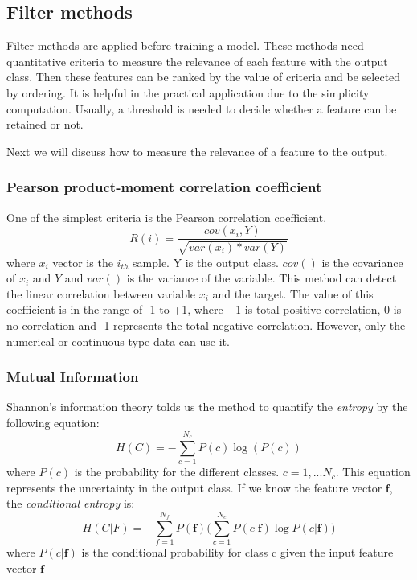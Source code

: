 \subsection{Filter methods}
Filter methods are applied before training a model. These methods need quantitative criteria to measure the relevance of each feature with the output class. Then these features can be ranked by the value of criteria and be selected by ordering. It is helpful in the practical application due to the simplicity computation. Usually, a threshold is needed to decide whether a feature can be retained or not. 

Next we will discuss how to measure the relevance of a feature to the output.

\subsubsection{Pearson product-moment correlation coefficient}

One of the simplest criteria is the Pearson correlation coefficient\cite{benesty2009pearson}.
\begin{equation} \label{Eq:pearsoncoefficient}
R(i)=\frac{cov(x_i,Y)}{\sqrt{var(x_i)*var(Y)}}
\end{equation}
where $x_i$ vector is the $i_{th}$ sample. Y is the output class. $cov()$ is the covariance of $x_i$ and $Y$ and $var()$ is the variance of the variable. This method can detect the linear correlation between variable $x_i$ and the target. The value of this coefficient is in the range of -1 to +1, where +1 is total positive correlation, 0 is no correlation and -1 represents the total negative correlation. However, only the numerical or continuous type data can use it.
\subsubsection{Mutual Information}
Shannon's information theory\cite{shannon2001mathematical} tolds us the method to quantify the \textit{entropy} by the following equation:
\begin{equation} \label{Eq:entropy}
H(C)=-\sum_{c=1}^{N_c}{P(c)\log(P(c))}
\end{equation}
where $P(c)$ is the probability for the different classes. $c=1,...N_c$. This equation represents the uncertainty in the output class. If we know the feature vector $\bm{f}$, the \textit{conditional entropy} is:
\begin{equation} \label{Eq:conditionalEntropy}
H(C|F)=-\sum_{f=1}^{N_f}{P(\bm{f})(\sum_{c=1}^{N_c}{P(c|\bm{f})\log{P(c|\bm{f})})}}
\end{equation}
where $P(c|\bm{f})$ is the conditional probability for class c given the input feature vector $\bm{f}$

